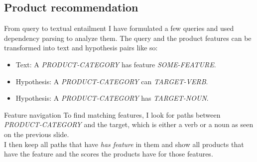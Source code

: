 \documentclass{beamer}
\begin{document}
\subsection{Product recommendation}
\begin{frame}{From query to textual entailment}
    I have formulated a few queries and used dependency parsing to analyze them.
The query and the product features can be transformed into text and hypothesis pairs like so:
\begin{itemize}
    \item Text: A \textit{PRODUCT-CATEGORY} has feature \textit{SOME-FEATURE}.
    \item Hypothesis: A \textit{PRODUCT-CATEGORY} can \textit{TARGET-VERB}.
    \item Hypothesis: A \textit{PRODUCT-CATEGORY} has \textit{TARGET-NOUN}.
\end{itemize}
\end{frame}

\begin{frame}{Feature navigation}
    To find matching features, I look for paths between \textit{PRODUCT-CATEGORY} and the target, which is either a verb or a noun as seen on the previous slide.\\
    I then keep all paths that have \textit{has feature} in them and show all products that have the feature and the scores the products have for those features.
\end{frame}
\end{document}
